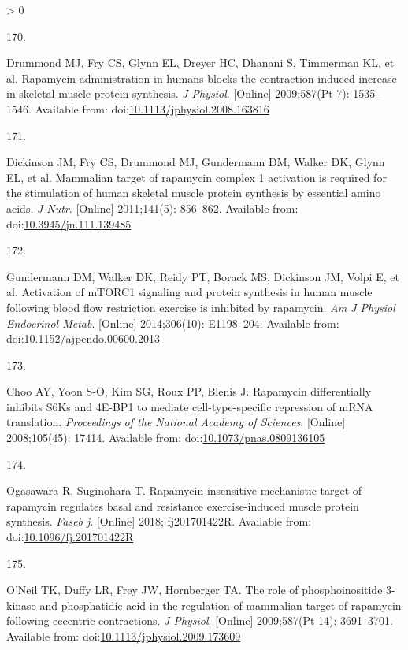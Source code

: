 \documentclass[twoside,10pt]{gihclass} %
\newlength{\cslhangindent}
\newlength{\csllabelwidth}
\newenvironment{CSLReferences}[3] %
 {%
  \setlength{\parindent}{0pt}
  \ifodd #1 \everypar{\setlength{\hangindent}{\cslhangindent}}\ignorespaces\fi
  \ifnum #2 > 0
  \setlength{\parskip}{#2\baselineskip}
  \fi
 }%
 {}
\newcommand{\CSLLeftMargin}[1]{\parbox[t]{\maxof{\widthof{#1}}{\csllabelwidth}}{#1}}
\newcommand{\CSLRightInline}[1]{\parbox[t]{\linewidth}{#1}}
\begin{document}
\begin{CSLReferences}{0}{0}
\leavevmode\hypertarget{ref-RN780}{}%
\CSLLeftMargin{170. }
\CSLRightInline{Drummond MJ, Fry CS, Glynn EL, Dreyer HC, Dhanani S, Timmerman KL, et al. Rapamycin administration in humans blocks the contraction-induced increase in skeletal muscle protein synthesis. \emph{J Physiol}. {[}Online{]} 2009;587(Pt 7): 1535--1546. Available from: doi:\href{https://doi.org/10.1113/jphysiol.2008.163816}{10.1113/jphysiol.2008.163816}}

\leavevmode\hypertarget{ref-RN781}{}%
\CSLLeftMargin{171. }
\CSLRightInline{Dickinson JM, Fry CS, Drummond MJ, Gundermann DM, Walker DK, Glynn EL, et al. Mammalian target of rapamycin complex 1 activation is required for the stimulation of human skeletal muscle protein synthesis by essential amino acids. \emph{J Nutr}. {[}Online{]} 2011;141(5): 856--862. Available from: doi:\href{https://doi.org/10.3945/jn.111.139485}{10.3945/jn.111.139485}}

\leavevmode\hypertarget{ref-RN2826}{}%
\CSLLeftMargin{172. }
\CSLRightInline{Gundermann DM, Walker DK, Reidy PT, Borack MS, Dickinson JM, Volpi E, et al. Activation of mTORC1 signaling and protein synthesis in human muscle following blood flow restriction exercise is inhibited by rapamycin. \emph{Am J Physiol Endocrinol Metab}. {[}Online{]} 2014;306(10): E1198--204. Available from: doi:\href{https://doi.org/10.1152/ajpendo.00600.2013}{10.1152/ajpendo.00600.2013}}

\leavevmode\hypertarget{ref-RN2839}{}%
\CSLLeftMargin{173. }
\CSLRightInline{Choo AY, Yoon S-O, Kim SG, Roux PP, Blenis J. Rapamycin differentially inhibits S6Ks and 4E-BP1 to mediate cell-type-specific repression of mRNA translation. \emph{Proceedings of the National Academy of Sciences}. {[}Online{]} 2008;105(45): 17414. Available from: doi:\href{https://doi.org/10.1073/pnas.0809136105}{10.1073/pnas.0809136105}}

\leavevmode\hypertarget{ref-RN2836}{}%
\CSLLeftMargin{174. }
\CSLRightInline{Ogasawara R, Suginohara T. Rapamycin-insensitive mechanistic target of rapamycin regulates basal and resistance exercise-induced muscle protein synthesis. \emph{Faseb j}. {[}Online{]} 2018; fj201701422R. Available from: doi:\href{https://doi.org/10.1096/fj.201701422R}{10.1096/fj.201701422R}}

\leavevmode\hypertarget{ref-RN2844}{}%
\CSLLeftMargin{175. }
\CSLRightInline{O'Neil TK, Duffy LR, Frey JW, Hornberger TA. The role of phosphoinositide 3-kinase and phosphatidic acid in the regulation of mammalian target of rapamycin following eccentric contractions. \emph{J Physiol}. {[}Online{]} 2009;587(Pt 14): 3691--3701. Available from: doi:\href{https://doi.org/10.1113/jphysiol.2009.173609}{10.1113/jphysiol.2009.173609}}


\end{CSLReferences}
\end{document}
